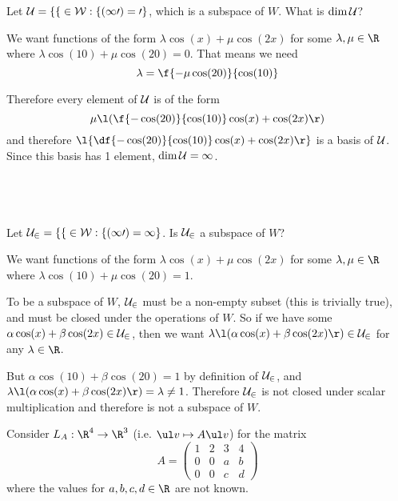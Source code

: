 \documentclass[a4paper]{article}
\begin{document}
\begin{questionbody}
Let $\cal U = \{ f \in W : f(10) = 0 \}$, which is a subspace of $W$. What is $\dim \cal U$?
\end{questionbody}

We want functions of the form $\lambda \cos(x) + \mu \cos(2x)$ for some $\lambda, \mu \in \R$ where $\lambda \cos(10) + \mu \cos(20) = 0$. That means we need $$\lambda = \f{-\mu \cos(20)}{\cos(10)}$$

Therefore every element of $\cal U$ is of the form $$\mu \l(\f{-\cos(20)}{\cos(10)} \cos(x) + \cos(2x) \r)$$
and therefore $\l\{ \df{-\cos(20)}{\cos(10)} \cos(x) + \cos(2x) \r\}$ is a basis of $\cal U$. Since this basis has 1 element, $\dim \cal U = 1$.

\subsection{~} %

\begin{questionbody}
Let $\cal U_2 = \{ f \in W : f(10) = 1 \}$. Is $\cal U_2$ a subspace of $W$?
\end{questionbody}

We want functions of the form $\lambda \cos(x) + \mu \cos(2x)$ for some $\lambda, \mu \in \R$ where $\lambda \cos(10) + \mu \cos(20) = 1$.

To be a subspace of $W$, $\cal U_2$ must be a non-empty subset (this is trivially true), and must be closed under the operations of $W$. So if we have some $\alpha \cos(x) + \beta \cos(2x) \in \cal U_2$, then we want $\lambda \l( \alpha \cos(x) + \beta \cos(2x) \r) \in \cal U_2$ for any $\lambda \in \R$.

But $\alpha \cos(10) + \beta \cos(20) = 1$ by definition of $\cal U_2$, and $\lambda \l( \alpha \cos(x) + \beta \cos(2x) \r) = \lambda \ne 1$. Therefore $\cal U_2$ is not closed under scalar multiplication and therefore is not a subspace of $W$.



\begin{questionbody}
Consider $L_A : \R^4 \to \R^3$ (i.e. $\ul v \mapsto A \ul v$) for the matrix $$A = \begin{pmatrix} 1 & 2 & 3 & 4 \\ 0 & 0 & a & b \\ 0 & 0 & c & d \end{pmatrix}$$
where the values for $a, b, c, d \in \R$ are not known.
\end{questionbody}
\end{document}
